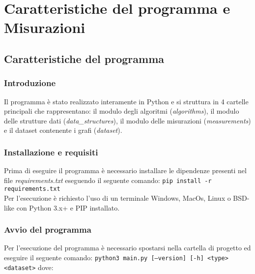 \section{Caratteristiche del programma e Misurazioni}

\subsection{Caratteristiche del programma}

\subsubsection{Introduzione}

Il programma è stato realizzato interamente in Python e si struttura in 4 cartelle principali che rappresentano: il modulo degli algoritmi (\textit{algorithms}), il modulo delle strutture dati (\textit{data\_structures}), il modulo delle misurazioni (\textit{measurements}) e il dataset contenente i grafi (\textit{dataset}). 

\subsubsection{Installazione e requisiti}

Prima di eseguire il programma è necessario installare le dipendenze presenti nel file \textit{requirements.txt} eseguendo il seguente comando: \texttt{pip install -r requirements.txt}
\\Per l'esecuzione è richiesto l'uso di un terminale Windows, MacOs, Linux o BSD-like con Python 3.x+ e PIP installato.

\subsubsection{Avvio del programma}

Per l'esecuzione del programma è necessario spostarsi nella cartella di progetto ed eseguire il seguente comando: 
\texttt{python3 main.py [--version] [-h] <type> <dataset>} dove:


